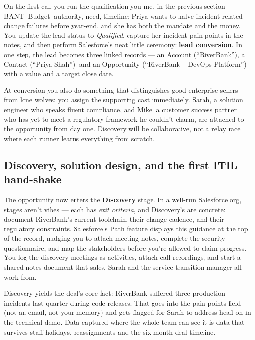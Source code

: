 On the first call you run the qualification you met in the previous section — BANT. Budget, authority, need, timeline: Priya wants to halve incident-related change failures before year-end, and she has both the mandate and the money. You update the lead status to \emph{Qualified}, capture her incident pain points in the notes, and then perform Salesforce's neat little ceremony: \textbf{lead conversion}. In one step, the lead becomes three linked records — an Account (``RiverBank''), a Contact (``Priya Shah''), and an Opportunity (``RiverBank – DevOps Platform'') with a value and a target close date.


At conversion you also do something that distinguishes good enterprise sellers from lone wolves: you assign the supporting cast immediately. Sarah, a solution engineer who speaks fluent compliance, and Mike, a customer success partner who has yet to meet a regulatory framework he couldn't charm, are attached to the opportunity from day one. Discovery will be collaborative, not a relay race where each runner learns everything from scratch.



\subsection{Discovery, solution design, and the first ITIL hand-shake}


The opportunity now enters the \textbf{Discovery} stage. In a well-run Salesforce org, stages aren't vibes — each has \emph{exit criteria}, and Discovery's are concrete: document RiverBank's current toolchain, their change cadence, and their regulatory constraints. Salesforce's Path feature displays this guidance at the top of the record, nudging you to attach meeting notes, complete the security questionnaire, and map the stakeholders before you're allowed to claim progress. You log the discovery meetings as activities, attach call recordings, and start a shared notes document that sales, Sarah and the service transition manager all work from.


Discovery yields the deal's core fact: RiverBank suffered three production incidents last quarter during code releases. That goes into the pain-points field (not an email, not your memory) and gets flagged for Sarah to address head-on in the technical demo. Data captured where the whole team can see it is data that survives staff holidays, reassignments and the six-month deal timeline.


